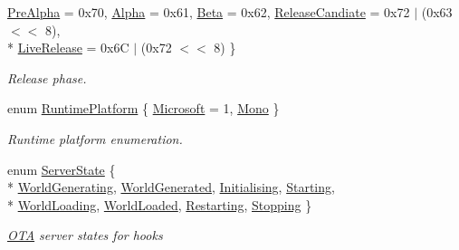 \begin{DoxyCompactItemize}
\hyperlink{namespaceOTA_a7e114a895c876876b92a8a256350f287ad31ee59ae635027030f12467a70eaae5}{Pre\+Alpha} = 0x70, 
\hyperlink{namespaceOTA_a7e114a895c876876b92a8a256350f287a6132295fcf5570fb8b0a944ef322a598}{Alpha} = 0x61, 
\hyperlink{namespaceOTA_a7e114a895c876876b92a8a256350f287a0b87d66b88c72957dfea8c9605016442}{Beta} = 0x62, 
\hyperlink{namespaceOTA_a7e114a895c876876b92a8a256350f287adc03a1b1f6f2d55a21ea07cea0a93ea9}{Release\+Candiate} = 0x72 $\vert$ (0x63 $<$$<$ 8), 
\\*
\hyperlink{namespaceOTA_a7e114a895c876876b92a8a256350f287afad48f18ebc2c9841e73117ad3c48eb5}{Live\+Release} = 0x6\+C $\vert$ (0x72 $<$$<$ 8)
 \}\begin{DoxyCompactList}\small\item\em Release phase. \end{DoxyCompactList}
\item 
enum \hyperlink{namespaceOTA_aba44b3a41f587d61c3dfecf49323c837}{Runtime\+Platform} \{ \hyperlink{namespaceOTA_aba44b3a41f587d61c3dfecf49323c837a140864078aeca1c7c35b4beb33c53c34}{Microsoft} = 1, 
\hyperlink{namespaceOTA_aba44b3a41f587d61c3dfecf49323c837a5d9b47bd3b65072e0d5daf55f01da086}{Mono}
 \}\begin{DoxyCompactList}\small\item\em Runtime platform enumeration. \end{DoxyCompactList}
\item 
enum \hyperlink{namespaceOTA_aeee15ce451435cc7f2fdb211337d0694}{Server\+State} \{ \\*
\hyperlink{namespaceOTA_aeee15ce451435cc7f2fdb211337d0694a256e42504ece1ebdb7256ff40fe2018c}{World\+Generating}, 
\hyperlink{namespaceOTA_aeee15ce451435cc7f2fdb211337d0694aac52508fbb03aaca13cb4a1e825f56b1}{World\+Generated}, 
\hyperlink{namespaceOTA_aeee15ce451435cc7f2fdb211337d0694aa3aec8ad5296270028f3c01db319169d}{Initialising}, 
\hyperlink{namespaceOTA_aeee15ce451435cc7f2fdb211337d0694ac2efe4bbd13e6cb0db293e72884273c0}{Starting}, 
\\*
\hyperlink{namespaceOTA_aeee15ce451435cc7f2fdb211337d0694a44e5df8f74f3e704bd6a29e641e43e0c}{World\+Loading}, 
\hyperlink{namespaceOTA_aeee15ce451435cc7f2fdb211337d0694af793e34b9f8de6f9ee6f0babcc44e7e8}{World\+Loaded}, 
\hyperlink{namespaceOTA_aeee15ce451435cc7f2fdb211337d0694a431dc808fe209d3c3e812991b46d40ef}{Restarting}, 
\hyperlink{namespaceOTA_aeee15ce451435cc7f2fdb211337d0694a7b7ecb39b9e110c2a31409a1672bad23}{Stopping}
 \}\begin{DoxyCompactList}\small\item\em \hyperlink{namespaceOTA}{O\+T\+A} server states for hooks \end{DoxyCompactList}
\end{DoxyCompactItemize}


